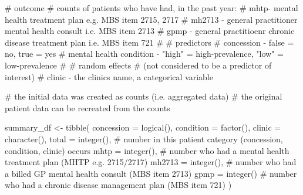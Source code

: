 \documentclass[
  letterpaper,
  DIV=11,
  numbers=noendperiod,
  oneside]{scrartcl}
\newenvironment{Shaded}{\begin{snugshade}}{\end{snugshade}}
\newcommand{\AttributeTok}[1]{\textcolor[rgb]{0.40,0.45,0.13}{#1}}
\newcommand{\CommentTok}[1]{\textcolor[rgb]{0.37,0.37,0.37}{#1}}
\newcommand{\FunctionTok}[1]{\textcolor[rgb]{0.28,0.35,0.67}{#1}}
\newcommand{\NormalTok}[1]{\textcolor[rgb]{0.00,0.23,0.31}{#1}}
\newcommand{\OtherTok}[1]{\textcolor[rgb]{0.00,0.23,0.31}{#1}}
\begin{document}
\begin{Shaded}
\begin{Highlighting}[]
\CommentTok{\# outcome}
\CommentTok{\#   counts of patients who have had, in the past year:}
\CommentTok{\#     mhtp{-} mental health treatment plan e.g. MBS item 2715, 2717}
\CommentTok{\#     mh2713 {-} general practitioner mental health consult i.e. MBS item 2713}
\CommentTok{\#     gpmp {-} general practitioenr chronic disease treatment plan i.e. MBS item 721}
\CommentTok{\# }
\CommentTok{\# predictors}
\CommentTok{\#   concession {-} false = no, true = yes}
\CommentTok{\#   mental health condition {-} "high" = high{-}prevalence, "low" = low{-}prevalence}
\CommentTok{\# }
\CommentTok{\# random effects}
\CommentTok{\#   (not considered to be a predictor of interest)}
\CommentTok{\#   clinic {-} the clinic\textquotesingle{}s name, a categorical variable}

\CommentTok{\# the initial data was created as counts (i.e. aggregated data)}
\CommentTok{\# the original patient data can be recreated from the counts}

\NormalTok{summary\_df }\OtherTok{\textless{}{-}} \FunctionTok{tibble}\NormalTok{(}
  \AttributeTok{concession =} \FunctionTok{logical}\NormalTok{(),}
  \AttributeTok{condition =} \FunctionTok{factor}\NormalTok{(),}
  \AttributeTok{clinic =} \FunctionTok{character}\NormalTok{(),}
  \AttributeTok{total =} \FunctionTok{integer}\NormalTok{(), }\CommentTok{\# number in this patient category (concession, condition, clinic) occurs}
  \AttributeTok{mhtp =} \FunctionTok{integer}\NormalTok{(), }\CommentTok{\# number who had a mental health treatment plan (MHTP e.g. 2715/2717)}
  \AttributeTok{mh2713 =} \FunctionTok{integer}\NormalTok{(), }\CommentTok{\# number who had a billed GP mental health consult (MBS item 2713)}
  \AttributeTok{gpmp =} \FunctionTok{integer}\NormalTok{() }\CommentTok{\# number who had a chronic disease management plan (MBS item 721)}
\NormalTok{)}


\end{Highlighting}
\end{Shaded}
\end{document}
